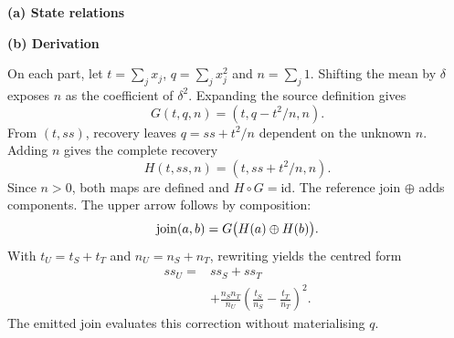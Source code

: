 \par\medskip
\noindent\begin{minipage}{\linewidth}
\captionsetup{type=figure}
\centering
\begin{minipage}[t]{0.48\linewidth}
\vspace{0pt}
\centering
{\small\sffamily\bfseries (a) State relations}\par\medskip

\end{minipage}\hfill
\begin{minipage}[t]{0.48\linewidth}
\vspace{0pt}
\small
\centerline{\sffamily\bfseries (b) Derivation}
\medskip
On each part, let $t=\sum_jx_j$, $q=\sum_jx_j^2$ and $n=\sum_j1$.
Shifting the mean by $\delta$ exposes $n$ as the coefficient of $\delta^2$.
Expanding the source definition gives
\[
G(t,q,n)=(t,q-t^2/n,n).
\]
From $(t,ss)$, recovery leaves $q=ss+t^2/n$ dependent on the unknown $n$.
Adding $n$ gives the complete recovery
\[
H(t,ss,n)=(t,ss+t^2/n,n).
\]
Since $n>0$, both maps are defined and $H\circ G=\mathrm{id}$.
The reference join $\oplus$ adds components.
The upper arrow follows by composition:
\[
\operatorname{join}(a,b)=G\bigl(H(a)\oplus H(b)\bigr).
\]
With $t_U=t_S+t_T$ and $n_U=n_S+n_T$, rewriting yields the centred form
\[
\begin{aligned}
ss_U={}&ss_S+ss_T\\
&+\frac{n_Sn_T}{n_U}
  \left(\frac{t_S}{n_S}-\frac{t_T}{n_T}\right)^2.
\end{aligned}
\]
The emitted join evaluates this correction without materialising $q$.
\end{minipage}
\caption{Variance: auxiliary states, recovery and join derivation.
Here $p\in\{S,T\}$ and $U=S\dunion T$ for disjoint non-empty parts.
Arrow annotations identify the subsections that develop each step:
constructing candidate expressions and synthesising states (\S\ref{sec:selection}--\ref{sec:synthesis}), recovery of reference states (\S\ref{sec:recovery}),
join derivation (\S\ref{sec:correctness}), and numerical formulation (\S\ref{sec:rebase}).}
\label{fig:recovery-square}
\end{minipage}\par\medskip
